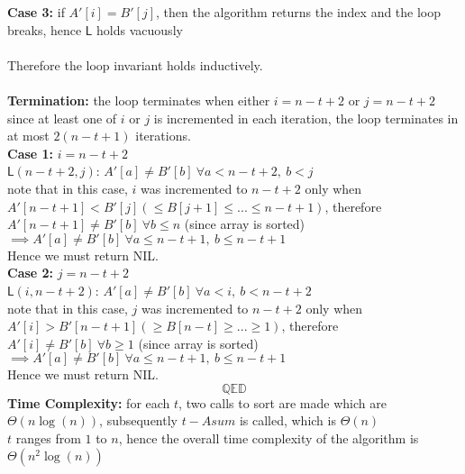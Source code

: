 \documentclass{article}
\begin{document}
\textbf{Case 3:} if $A'[i] = B'[j]$, then the algorithm returns the index and the loop breaks, hence $\mathsf{L}$ holds vacuously\\
\\
Therefore the loop invariant holds inductively.\\
\\
\textbf{Termination:} the loop terminates when either $i = n-t+2$ or $j = n-t+2$\\
since at least one of $i$ or $j$ is incremented in each iteration, the loop terminates in at most $2(n-t+1)$ iterations.\\
\textbf{Case 1:} $i = n-t+2$\\
$\mathsf{L}(n-t+2, j)$: $A'[a] \neq B'[b] ~ \forall a < n-t+2, ~ b < j$\\
note that in this case, $i$ was incremented to $n-t+2$ only when $A'[n-t+1] < B'[j] (\leq B[j+1] \leq...\leq n-t+1)$, therefore $A'[n-t+1] \neq B'[b] ~ \forall b \leq n$ (since array is sorted)\\
$\implies A'[a] \neq B'[b] ~ \forall a \leq n-t+1, ~ b \leq n-t+1$\\
Hence we must return NIL.\\
\textbf{Case 2:} $j = n-t+2$\\
$\mathsf{L}(i, n-t+2)$: $A'[a] \neq B'[b] ~ \forall a < i, ~ b < n-t+2$\\
note that in this case, $j$ was incremented to $n-t+2$ only when $A'[i] > B'[n-t+1] (\geq B[n-t] \geq...\geq 1)$, therefore $A'[i] \neq B'[b] ~ \forall b \geq 1$ (since array is sorted)\\
$\implies A'[a] \neq B'[b] ~ \forall a \leq n-t+1, ~ b \leq n-t+1$\\
Hence we must return NIL.\\
$$\mathbb{Q} \mathbb{E} \mathbb{D}$$
\textbf{Time Complexity:} for each $t$, two calls to sort are made which are $\varTheta(n \log(n))$, subsequently $t-Asum$ is called, which is $\varTheta(n)$\\
$t$ ranges from $1$ to $n$, hence the overall time complexity of the algorithm is $\varTheta(n^2 \log(n))$\\  
\end{document}
